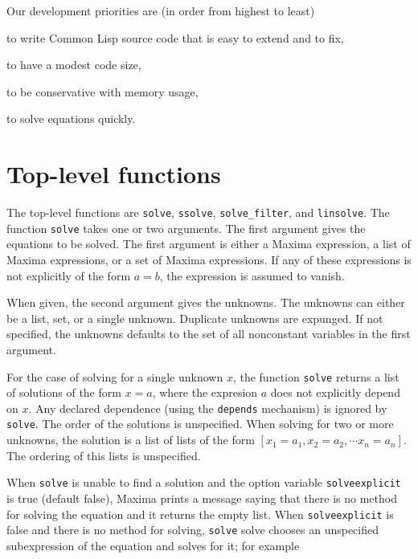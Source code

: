 \documentclass[]{scrartcl}
\begin{document}
\noindent Our development priorities are (in order from highest to least)

\begin{alphalist}[]

\item to write  Common Lisp source code that is easy to extend and to fix,

\item to have a modest code size,

\item to be conservative with memory usage,

\item to solve equations quickly.

\end{alphalist}

\section{Top-level functions}

The top-level functions are \texttt{solve}, \texttt{ssolve}, \texttt{solve\_filter},
and \texttt{linsolve}. The function \texttt{solve} takes  one or two arguments. The first
argument gives the equations to be solved. The first argument is either a Maxima expression,
a list of Maxima expressions, or a set of Maxima expressions. If any of these expressions is
not explicitly of the form \(a = b\), the expression is assumed to vanish.

When given, the second argument gives the unknowns. The unknowns can either be a list, set, or
a single unknown. Duplicate unknowns are expunged. If not specified, the unknowns defaults to
the set of all nonconstant variables in the first argument.

For the case of solving for a single unknown \(x\), the function \texttt{solve} returns a list
of solutions of the form \(x = a\), where the expresion \(a\) does not explicitly depend on \(x\).
Any declared dependence (using the \texttt{depends} mechanism) is ignored by \texttt{solve}.
The order of the solutions is unspecified. When solving for two or more unknowns, the solution
is a list of lists of the form \([x_1 = a_1, x_2 = a_2, \cdots x_n = a_n] \). The ordering of
this lists is unspecified.

When \texttt{solve} is unable to find a solution and the option variable \texttt{solveexplicit}
is true (default false), Maxima prints a message saying that there is no method for solving the
equation and it returns the empty list. When \texttt{solveexplicit} is false and there is no
method for solving, \texttt{solve} solve chooses an unspecified subexpression of the equation
and solves for it; for example
\end{document}
